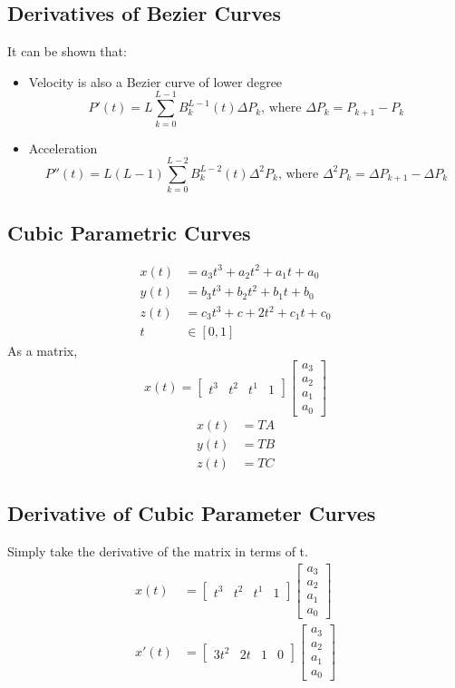 \documentclass{article}
\begin{document}
\subsection*{Derivatives of Bezier Curves}
It can be shown that:
\begin{itemize}
    \item Velocity is also a Bezier curve of lower degree
    \[P'(t) = L \sum_{k = 0}^{L - 1} B_k^{L - 1}(t) \Delta P_k\text{, where } \Delta P_k = P_{k + 1} - P_k\]
    \item Acceleration
    \[P''(t) = L(L - 1) \sum_{k = 0}^{L - 2} B_k^{L - 2}(t) \Delta^2 P_k \text{, where } \Delta^2 P_k = \Delta P_{k + 1} - \Delta P_k\]
\end{itemize}

\subsection*{Cubic Parametric Curves}
\begin{align*}
    x(t) &= a_3 t^3 + a_2 t^2 + a_1 t + a_0\\
    y(t) &= b_3 t^3 + b_2 t^2 + b_1 t + b_0\\
    z(t) &= c_3 t^3 + c+2 t^2 + c_1 t + c_0\\
    t &\in [0, 1]
\end{align*}
As a matrix,
\[x(t) = \begin{bmatrix}t^3 & t^2 & t^1 & 1\end{bmatrix} \begin{bmatrix} a_3 \\ a_2 \\ a_1 \\ a_0 \end{bmatrix}\]
\begin{align*}
    x(t) &= TA\\
    y(t) &= TB\\
    z(t) &= TC
\end{align*}

\subsection*{Derivative of Cubic Parameter Curves}
Simply take the derivative of the matrix in terms of t.
\begin{align*}
    x(t) &= \begin{bmatrix}t^3 & t^2 & t^1 & 1\end{bmatrix} \begin{bmatrix} a_3 \\ a_2 \\ a_1 \\ a_0 \end{bmatrix}\\
    x'(t) &= \begin{bmatrix}3t^2 & 2t & 1 & 0\end{bmatrix} \begin{bmatrix} a_3 \\ a_2 \\ a_1 \\ a_0 \end{bmatrix}
\end{align*}
\end{document}
